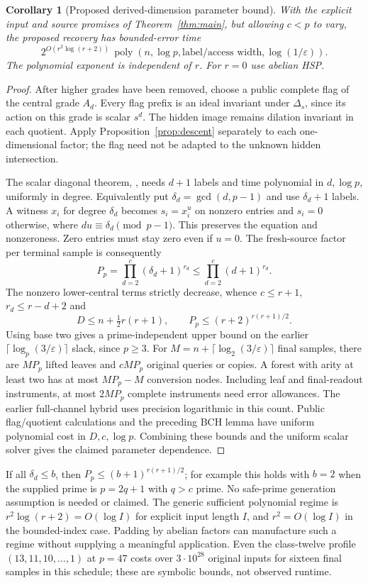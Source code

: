 \documentclass[11pt]{article}
\newtheorem{corollary}[theorem]{Corollary}
\theoremstyle{remark}
\newcommand{\eps}{\varepsilon}
\begin{document}
\begin{corollary}[Proposed derived-dimension parameter bound]
With the explicit input and source promises of Theorem~\ref{thm:main},
but allowing $c<p$ to vary, the proposed recovery has bounded-error time
\[
 2^{O(r^2\log(r+2))}\,
 \operatorname{poly}(n,\log p,\text{label/access width},\log(1/\eps)).
\]
The polynomial exponent is independent of $r$. For $r=0$ use abelian HSP.
\end{corollary}
\begin{proof}
After higher grades have been removed, choose a public complete flag of
the central grade $A_d$. Every flag prefix is an ideal invariant under
$\Delta_s$, since its action on this grade is scalar $s^d$. The hidden
image remains dilation invariant in each quotient. Apply
Proposition~\ref{prop:descent} separately to each one-dimensional factor;
the flag need not be adapted to the unknown hidden intersection.

The scalar diagonal theorem, \cite[Fact 2]{is}, needs $d+1$ labels and
time polynomial in $d,\log p$, uniformly in degree. Equivalently put
$\delta_d=\gcd(d,p-1)$ and use $\delta_d+1$ labels. A witness $x_i$ for
degree $\delta_d$ becomes $s_i=x_i^u$ on nonzero entries and $s_i=0$
otherwise, where $du\equiv\delta_d\pmod {p-1}$. This preserves the
equation and nonzeroness. Zero entries must stay zero even if $u=0$.
The fresh-source factor per terminal sample is consequently
\[
 P_p=\prod_{d=2}^c(\delta_d+1)^{r_d}
 \le \prod_{d=2}^c(d+1)^{r_d}.
\]
The nonzero lower-central terms strictly decrease, whence
$c\le r+1$, $r_d\le r-d+2$ and
\[
 D\le n+\tfrac12r(r+1),\qquad
 P_p\le (r+2)^{r(r+1)/2}.
\]
Using base two gives a prime-independent upper bound on the earlier
$\lceil\log_p(3/\eps)\rceil$ slack, since $p\ge3$.
For $M=n+\lceil\log_2(3/\eps)\rceil$ final samples, there are $MP_p$
lifted leaves and $cMP_p$ original queries or copies. A forest with
arity at least two has at most $MP_p-M$ conversion nodes. Including leaf
and final-readout instruments, at most $2MP_p$ complete instruments need
error allowances. The earlier full-channel hybrid uses precision logarithmic
in this count. Public flag/quotient calculations and the preceding BCH
lemma have uniform polynomial cost in $D,c,\log p$. Combining these bounds
and the uniform scalar solver gives the claimed parameter dependence.
\end{proof}

If all $\delta_d\le b$, then $P_p\le(b+1)^{r(r+1)/2}$; for example this
holds with $b=2$ when the supplied prime is $p=2q+1$ with $q>c$ prime.
No safe-prime generation assumption is needed or claimed. The generic
sufficient polynomial regime is $r^2\log(r+2)=O(\log I)$ for explicit
input length $I$, and $r^2=O(\log I)$ in the bounded-index case.
Padding by abelian factors can manufacture such a regime without supplying
a meaningful application. Even the class-twelve profile $(13,11,10,\ldots,1)$
at $p=47$ costs over $3\cdot10^{28}$ original inputs for sixteen final
samples in this schedule; these are symbolic bounds, not observed runtime.
\end{document}
